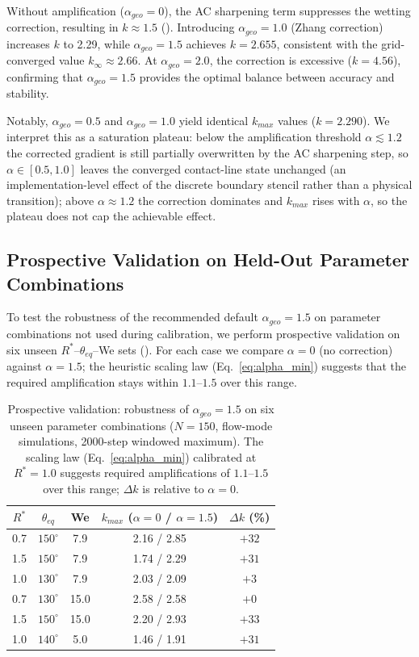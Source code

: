 Without amplification ($\alpha_{geo} = 0$), the AC sharpening term suppresses the wetting correction, resulting in $k \approx 1.5$ (). Introducing $\alpha_{geo} = 1.0$ (Zhang correction) increases $k$ to 2.29, while $\alpha_{geo} = 1.5$ achieves $k = 2.655$, consistent with the grid-converged value $k_\infty \approx 2.66$. At $\alpha_{geo} = 2.0$, the correction is excessive ($k = 4.56$), confirming that $\alpha_{geo} = 1.5$ provides the optimal balance between accuracy and stability.

Notably, $\alpha_{geo} = 0.5$ and $\alpha_{geo} = 1.0$ yield identical $k_{max}$ values ($k = 2.290$). We interpret this as a saturation plateau: below the amplification threshold $\alpha \lesssim 1.2$ the corrected gradient is still partially overwritten by the AC sharpening step, so $\alpha \in [0.5, 1.0]$ leaves the converged contact-line state unchanged (an implementation-level effect of the discrete boundary stencil rather than a physical transition); above $\alpha \approx 1.2$ the correction dominates and $k_{max}$ rises with $\alpha$, so the plateau does not cap the achievable effect.

\subsection{Prospective Validation on Held-Out Parameter Combinations}\label{subsec:prospective}

To test the robustness of the recommended default $\alpha_{geo}=1.5$ on parameter combinations not used during calibration, we perform prospective validation on six unseen $R^*$--$\theta_{eq}$--We sets (). For each case we compare $\alpha=0$ (no correction) against $\alpha=1.5$; the heuristic scaling law (Eq.~\ref{eq:alpha_min}) suggests that the required amplification stays within $1.1$--$1.5$ over this range.

\begin{table}[htbp]
\centering
\caption{Prospective validation: robustness of $\alpha_{geo}=1.5$ on six unseen parameter combinations ($N=150$, flow-mode simulations, 2000-step windowed maximum). The scaling law (Eq.~\ref{eq:alpha_min}) calibrated at $R^*=1.0$ suggests required amplifications of $1.1$--$1.5$ over this range; $\Delta k$ is relative to $\alpha=0$.}
\label{tab:prospective}
\begin{tabular}{c|c|c|c|c}
\hline
$R^*$ & $\theta_{eq}$ & We & $k_{max}$ ($\alpha=0$ / $\alpha=1.5$) & $\Delta k$ (\%) \\
\hline
0.7  & $150^\circ$ & 7.9  & 2.16 / 2.85 & $+32$ \\
1.5  & $150^\circ$ & 7.9  & 1.74 / 2.29 & $+31$ \\
1.0  & $130^\circ$ & 7.9  & 2.03 / 2.09 & $+3$ \\
0.7  & $130^\circ$ & 15.0 & 2.58 / 2.58 & $+0$ \\
1.5  & $150^\circ$ & 15.0 & 2.20 / 2.93 & $+33$ \\
1.0  & $140^\circ$ & 5.0  & 1.46 / 1.91 & $+31$ \\
\hline
\end{tabular}
\end{table}

